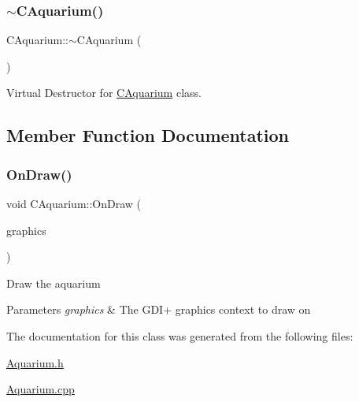 \subsubsection{\texorpdfstring{$\sim$\+C\+Aquarium()}{~CAquarium()}}
{\footnotesize\ttfamily C\+Aquarium\+::$\sim$\+C\+Aquarium (\begin{DoxyParamCaption}{ }\end{DoxyParamCaption})\hspace{0.3cm}{\ttfamily [virtual]}}

Virtual Destructor for \mbox{\hyperlink{class_c_aquarium}{C\+Aquarium}} class. 

\subsection{Member Function Documentation}
\mbox{\label{class_c_aquarium_a20b4899158d1ba4bc41217630d47e180}} 
\subsubsection{\texorpdfstring{On\+Draw()}{OnDraw()}}
{\footnotesize\ttfamily void C\+Aquarium\+::\+On\+Draw (\begin{DoxyParamCaption}\item[{Gdiplus\+::\+Graphics $\ast$}]{graphics }\end{DoxyParamCaption})}

Draw the aquarium 
\begin{DoxyParams}{Parameters}
{\em graphics} & The G\+D\+I+ graphics context to draw on \\
\hline
\end{DoxyParams}


The documentation for this class was generated from the following files\+:\begin{DoxyCompactItemize}
\item 
\mbox{\hyperlink{_aquarium_8h}{Aquarium.\+h}}\item 
\mbox{\hyperlink{_aquarium_8cpp}{Aquarium.\+cpp}}\end{DoxyCompactItemize}
